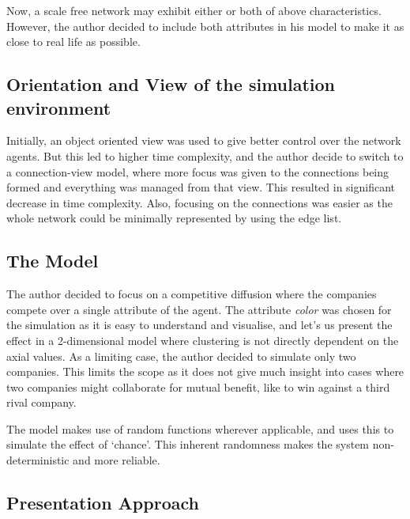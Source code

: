 Now, a scale free network may exhibit either or both of above characteristics. However, the author decided to include both attributes in his model to make it as close to real life as possible. 

\subsection{Orientation and View of the simulation environment}

Initially, an object oriented view was used to give better control over the network agents. But this led to higher time complexity, and the author decide to switch to a connection-view model, where more focus was given to the connections being formed and everything was managed from that view. This resulted in significant decrease in time complexity.
Also, focusing on the connections was easier as the whole network could be minimally represented by using the edge list.



\subsection{The Model}
The author decided to focus on a competitive diffusion where the companies compete over a single attribute of the agent. The attribute \emph{color} was chosen for the simulation as it is easy to understand and visualise, and let's us present the effect in a 2-dimensional model where clustering is not directly dependent on the axial values. 
As a limiting case, the author decided to simulate only two companies. This limits the scope as it does not give much insight into cases where two companies might collaborate for mutual benefit, like to win against a third rival company.

The model makes use of random functions wherever applicable, and uses this to simulate the effect of `chance'. This inherent randomness makes the system non-deterministic and more reliable.



\subsection{Presentation Approach}
\label{sec:presentaion}

